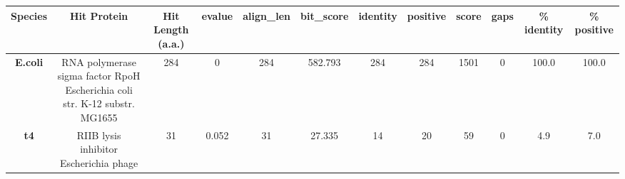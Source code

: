 \begin{tabular}{|c|c|c|c|c|c|c|c|c|c|c|c|} \hline
\textbf{Species} & \textbf{Hit Protein} & \textbf{Hit Length (a.a.)} & \textbf{evalue} & \textbf{align\_len} & \textbf{bit\_score} & \textbf{identity} & \textbf{positive} & \textbf{score} & \textbf{gaps} & \textbf{\% identity} & \textbf{\% positive} \\ \hline
\textbf{E.coli} & RNA polymerase sigma factor RpoH Escherichia coli str. K-12 substr. MG1655 & 284 & 0 & 284 & 582.793 & 284 & 284 & 1501 & 0 & 100.0 & 100.0\\
\textbf{t4} & RIIB lysis inhibitor Escherichia phage  & 31 & 0.052 & 31 & 27.335 & 14 & 20 & 59 & 0 & 4.9 & 7.0\\
\hline \end{tabular}
